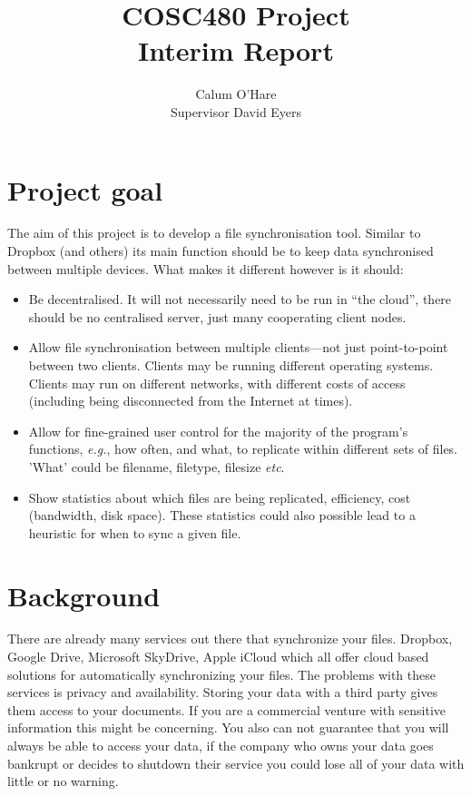 \documentclass[12pt]{article}
\title{COSC480 Project \\ Interim Report}
\author{Calum O'Hare \\ Supervisor David Eyers}
\date{}
\begin{document}
\maketitle

\section{Project goal}
The aim of this project is to develop a file synchronisation tool.
Similar to  Dropbox (and others) its main function should be to
keep data synchronised between multiple devices.
What makes it different however is it should:
\begin{itemize}
\item Be decentralised. It will not necessarily need to be run in ``the cloud'', there should be
no centralised server, just many cooperating client nodes.

\item Allow file synchronisation between multiple clients---not just point-to-point between two clients. Clients may be
running different operating systems. Clients may run on different networks, with different costs of access (including being disconnected from the Internet at times).

\item Allow for fine-grained user control for the majority of the program's
functions, \emph{e.g.}, how often, and what, to replicate within different sets of files. 'What' could be filename, filetype, filesize \emph{etc}.

\item Show statistics about which files are being replicated, efficiency,
cost (bandwidth, disk space). These statistics could also possible lead
to a heuristic for when to sync a given file.
\end{itemize}
\section{Background}
There are already many services out there that synchronize your
files. Dropbox, Google Drive, Microsoft SkyDrive, Apple iCloud
which all offer cloud based solutions for automatically
synchronizing your files. The problems with these
services is privacy and availability. Storing your data with a
third party gives them access to your documents. If you
are a commercial venture with sensitive information
this might be concerning. You also can not guarantee
that you will always be able to access your data, if
the company who owns your data goes bankrupt or
decides to shutdown their service you could lose all
of your data with little or no warning. 
\end{document}
